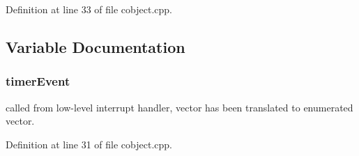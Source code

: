 Definition at line 33 of file cobject.\-cpp.



\subsection{Variable Documentation}
\subsubsection[{timer\-Event}]{ timer\-Event\hspace{0.3cm}{\ttfamily [static]}}\label{cobject_8cpp_a6f1376fd36be6b33cb34916bbf993ac1}


called from low-\/level interrupt handler, vector has been translated to enumerated vector. 



Definition at line 31 of file cobject.\-cpp.

